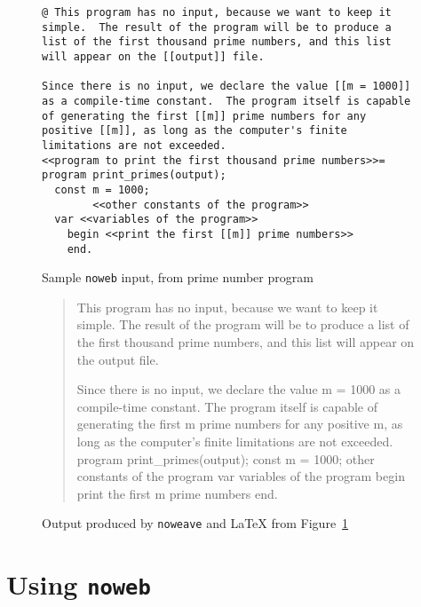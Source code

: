 \begin{figure}
\begin{verbatim}
@ This program has no input, because we want to keep it
simple.  The result of the program will be to produce a
list of the first thousand prime numbers, and this list
will appear on the [[output]] file.

Since there is no input, we declare the value [[m = 1000]]
as a compile-time constant.  The program itself is capable
of generating the first [[m]] prime numbers for any
positive [[m]], as long as the computer's finite
limitations are not exceeded.
<<program to print the first thousand prime numbers>>=
program print_primes(output);
  const m = 1000;
        <<other constants of the program>>
  var <<variables of the program>>
    begin <<print the first [[m]] prime numbers>>
    end.
\end{verbatim} 
\caption{Sample {\tt noweb} input, from prime number program}
\label{sample-input}
\end{figure}



\begin{figure}
\begin{quote} 

This program has no input, because we want to keep it simple.
The result of the program will be to produce a list of the first
thousand prime numbers, and this list will appear on the \code{}output\edoc{}
file.

Since there is no input, we declare the value \code{}m = 1000\edoc{} as a
compile-time constant.
The program itself is capable of generating the first \code{}m\edoc{} prime
numbers for any positive \code{}m\edoc{}, as long as the computer's finite
limitations are not exceeded.
\nwenddocs
{}
\endmoddef
program print_primes(output);
  const m = 1000;
        \LA{}other constants of the program\RA{}
  var \LA{}variables of the program\RA{}
    begin \LA{}print the first \code{}m\edoc{} prime numbers\RA{}
    end.
\nwendcode
\end{quote} 
\caption{Output produced by {\tt noweave} and {\LaTeX} from Figure~\protect\ref{sample-input}}
\label{noweave-output}
\end{figure}

\section{Using {\tt noweb}}%


